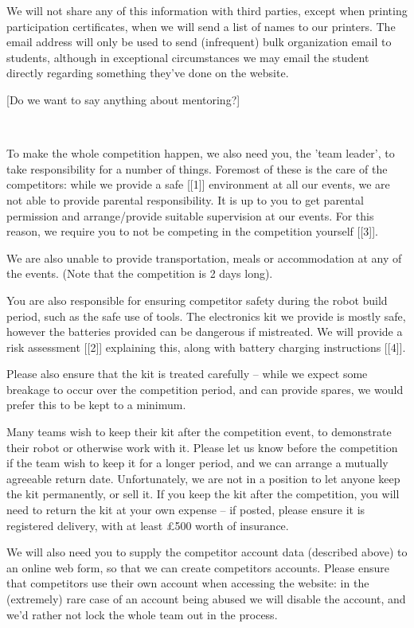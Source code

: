 \documentclass[a4paper]{article}
\begin{document}
We will not share any of this information with third parties, except
when printing participation certificates, when we will send a list of
names to our printers. The email address will only be used to send
(infrequent) bulk organization email to students, although in
exceptional circumstances we may email the student directly regarding
something they've done on the website.

[Do we want to say anything about mentoring?]

~

To make the whole competition happen, we also need you, the 'team
leader', to take responsibility for a number of things. Foremost of
these is the care of the competitors: while we provide a safe [[1]]
environment at all our events, we are not able to provide parental
responsibility. It is up to you to get parental permission and
arrange/provide suitable supervision at our events. For this reason, we
require you to not be competing in the competition yourself [[3]].

We are also unable to provide transportation, meals or accommodation  at
any of the events. (Note that the competition is 2 days long).

You are also responsible for ensuring competitor safety during the robot
build period, such as the safe use of tools. The electronics kit we
provide is mostly safe, however the batteries provided can be dangerous
if mistreated. We will provide a risk assessment [[2]] explaining this,
along with battery charging instructions [[4]].

Please also ensure that the kit is treated carefully -- while we expect
some breakage to occur over the competition period, and can provide
spares, we would prefer this to be kept to a minimum.

Many teams wish to keep their kit after the competition event, to
demonstrate their robot or otherwise work with it. Please let us know
before the competition if the team wish to keep it for a longer period,
and we can arrange a mutually agreeable return date. Unfortunately, we
are not in a position to let anyone keep the kit permanently, or sell
it. If you keep the kit after the competition, you will need to return
the kit at your own expense -- if posted, please ensure it is registered
delivery, with at least £500 worth of insurance.

We will also need you to supply the competitor account data (described
above) to an online web form, so that we can create competitors
accounts. Please ensure that competitors use their own account when
accessing the website: in the (extremely) rare case of an account being
abused we will disable the account, and we'd rather not lock the whole
team out in the process.
\end{document}
